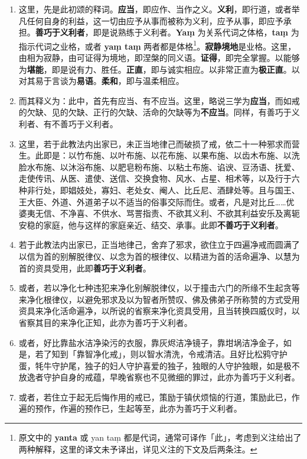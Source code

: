 \begin{enumerate}\item 这里，先是此初颂的释词。\textbf{应当}，即应作、当作之义。\textbf{义利}，即行道，或者举凡任何自身的利益，这一切由应予从事而被称为义利，应予从事，即应予承担。\textbf{善巧于义利者}，即是说熟练于义利者。\textbf{Yaṃ} 为关系代词之体格，\textbf{taṃ} 为指示代词之业格，或者 \textbf{yaṃ taṃ} 两者都是体格\footnote{原文中的 \textbf{yanta} 或 yan taṃ 都是代词，通常可译作「此」，考虑到义注给出了两种解释，这里的译文未予译出，详见义注的下文及后两条注。}。\textbf{寂静境地}是业格。这里，由相为寂静，由可证得为境地，即涅槃的同义语。\textbf{证得}，即完全掌握。以能够为\textbf{堪能}，即是说有力、胜任。\textbf{正直}，即与诚实相应。以非常正直为\textbf{极正直}。以对其易于言谈为\textbf{易语}。\textbf{柔和}，即与温柔相应。
\item 而其释义为：此中，首先有应当、有不应当。这里，略说三学为\textbf{应当}，而如戒的欠缺、见的欠缺、正行的欠缺、活命的欠缺等为\textbf{不应当}。同样，有善巧于义利者、有不善巧于义利者。
\item 这里，若于此教法内出家已，未正当地律己而破损了戒，依二十一种邪求而营生。此即是：以竹布施、以叶布施、以花布施、以果布施、以齿木布施、以洗脸水布施、以沐浴布施、以肥皂粉布施、以粘土布施、谄谀、豆汤语、抚爱、走使传讯、从医、遣使、送信、交换食物、风水、占星、相术等，以及行于六种非行处，即娼妓处，寡妇、老处女、阉人、比丘尼、酒肆处等。且与国王、王大臣、外道、外道弟子以不适当的俗事交际而住。或者，凡是对比丘……优婆夷无信、不净喜、不供水、骂詈指责、不欲其义利、不欲其利益安乐及离轭安稳的家庭，他与这样的家庭亲近、结交、承事。此即\textbf{不善巧于义利者}。
\item 若于此教法内出家已，正当地律己，舍弃了邪求，欲住立于四遍净戒而圆满了以信为首的别解脱律仪、以念为首的根律仪、以精进为首的活命遍净、以慧为首的资具受用，此即\textbf{善巧于义利者}。
\item 或者，若以净化七种违犯来净化别解脱律仪，以于撞击六门的所缘不生起贪等来净化根律仪，以避免邪求及以为智者所赞叹、佛及佛弟子所称赞的方式受用资具来净化活命遍净，以所说的省察来净化资具受用，且当转换四威仪时，以省察其目的来净化正知，此亦为善巧于义利者。
\item 或者，好比靠盐水洁净染污的衣服，靠灰烬洁净镜子，靠坩埚洁净金子，如是，若了知到「靠智净化戒」，则以智水清洗，令戒清洁。且好比松鸦守护蛋，牦牛守护尾，独子的妇人守护喜爱的独子，独眼的人守护独眼，如是极不放逸者守护自身的戒蕴，早晚省察也不见微细的罪过，此亦为善巧于义利者。
\item 或者，若住立于起无后悔作用的戒已，策励于镇伏烦恼的行道，策励此已，作遍的预作，作遍的预作已，生起等至，此亦为善巧于义利者。

\end{enumerate}
